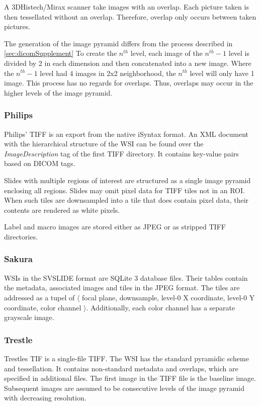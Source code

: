 A 3DHistech/Mirax scanner take images with an overlap. Each picture taken is then tessellated without an overlap. Therefore, overlap only occurs between taken pictures\cite{web:openslide}.

The generation of the image pyramid differs from the process described in \ref{sec:dicomSupplement} To create the $n^{th}$ level, each image of the $n^{th}-1$ level is divided by 2 in each dimension and then concatenated into a new image. Where the $n^{th}-1$ level had 4 images in 2x2 neighborhood, the $n^{th}$ level will only have 1 image. This process has no regards for overlaps. Thus, overlaps may occur in the higher levels of the image pyramid\cite{web:openslide}.


\subsubsection{Philips}
Philips' TIFF is an export from the native iSyntax format. An XML document with the hierarchical structure of the WSI can be found over the \emph{ImageDescription} tag of the first TIFF directory. It contains key-value pairs based on DICOM tags\cite{web:openslide}.

Slides with multiple regions of interest are structured as a single image pyramid enclosing all regions. Slides may omit pixel data for TIFF tiles not in an ROI. When such tiles are downsampled into a tile that does contain pixel data, their contents are rendered as white pixels\cite{web:openslide}.

Label and macro images are stored either as JPEG or as stripped TIFF directories.


\subsubsection{Sakura}
WSIs in the SVSLIDE format are SQLite 3 database files. Their tables contain the metadata, associated images and tiles in the JPEG format. The tiles are addressed as a tupel of $\langle$ focal plane, downsample, level-0 X coordinate, level-0 Y coordinate, color channel $\rangle$. Additionally, each color channel has a separate grayscale image\cite{web:openslide}.


\subsubsection{Trestle}
Trestles TIF is a single-file TIFF. The WSI has the standard pyramidic scheme and tessellation. It contains non-standard metadata and overlaps, which are specified in additional files. The first image in the TIFF file is the baseline image. Subsequent images are assumed to be consecutive levels of the image pyramid with decreasing resolution\cite{web:openslide}.


